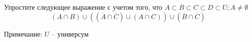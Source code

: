 \question
Упростите следующее выражение с учетом того, что $A\subset B \subset C \subset D \subset U; A \neq \emptyset$
\begin{equation*}
	(A \cap B) \cup ((\overline{A} \cap \overline{C}) \cup (A \cap C ))\cup (\overline{B} \cap \overline{C})
\end{equation*}

Примечание: $U$ -- универсум